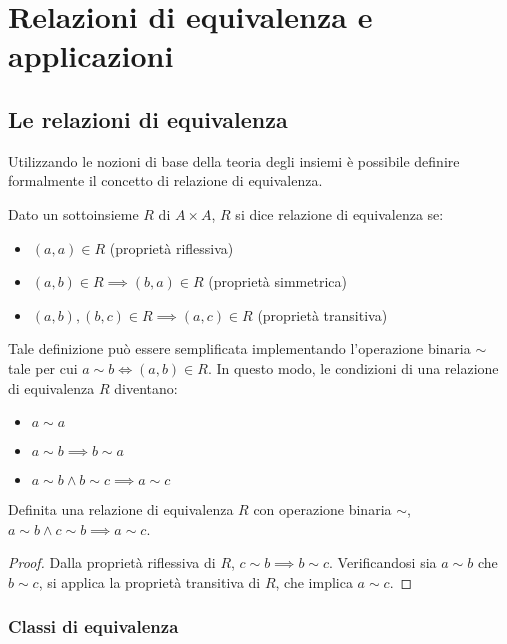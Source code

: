 \chapter{Relazioni di equivalenza e applicazioni}

\section{Le relazioni di equivalenza}

Utilizzando le nozioni di base della teoria degli
insiemi è possibile definire formalmente il concetto
di relazione di equivalenza.

Dato un sottoinsieme $R$ di $A \times A$, $R$ si
dice relazione di equivalenza se:

\begin{itemize}
    \item $(a,a) \in R$ (proprietà riflessiva)
    \item $(a,b) \in R \implies (b,a) \in R$ (proprietà simmetrica)
    \item $(a,b), (b,c) \in R \implies (a,c) \in R$ (proprietà transitiva)
\end{itemize}

Tale definizione può essere semplificata
implementando l'operazione binaria $\sim$ tale per cui
$a\sim b \iff (a,b) \in R$. In questo modo, le condizioni
di una relazione di equivalenza $R$ diventano:

\begin{itemize}
    \item $a \sim a$
    \item $a \sim b \implies b \sim a$
    \item $a \sim b \land b \sim c \implies a \sim c$
\end{itemize}

\begin{theorem}
    Definita una relazione di equivalenza $R$ con operazione
    binaria $\sim$, $a \sim b \land c \sim b \implies a \sim c$.
\end{theorem}

\begin{proof}
    Dalla proprietà riflessiva di $R$, $c \sim b \implies b \sim c$.
    Verificandosi sia $a \sim b$ che $b \sim c$, si applica la proprietà
    transitiva di $R$, che implica $a \sim c$.
\end{proof}

\subsection{Classi di equivalenza}

